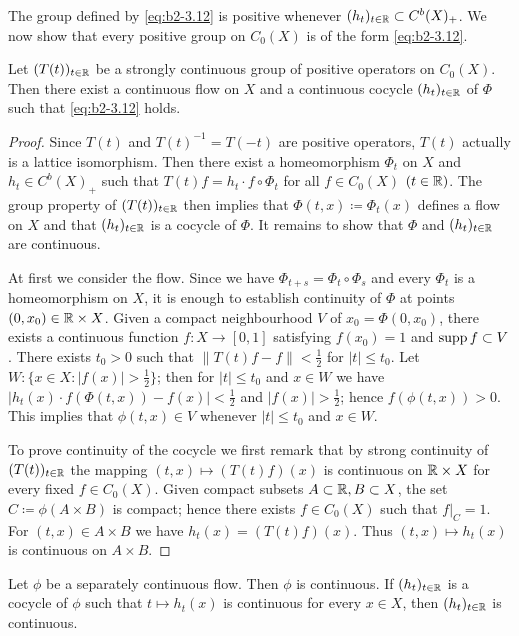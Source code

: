 The group defined by \eqref{eq:b2-3.12} is positive whenever $(h_t)_{t \in \mathbb{R}} \subset C^{b} (X)_+$.
We now show that every positive group on $C_0(X)$ is of the form \eqref{eq:b2-3.12}.
\begin{proposition}\label{prop:b2-3.9}
Let $(T(t))_{t \in \mathbb{R}}$ be a strongly continuous group of positive operators on $C_0(X)$.
Then there exist a continuous flow on $X$ and a continuous cocycle $(h_t)_{t \in \mathbb{R}}$ of $\Phi$ such that \eqref{eq:b2-3.12} holds.
\end{proposition}
\begin{proof}
Since $T(t)$ and $T(t)^{-1} = T(-t)$ are positive operators, $T(t)$ actually is a lattice isomorphism.
Then there exist a homeomorphism $\Phi_t$ on $X$ and $h_t \in C^{b}(X)_+$ such that $T(t)f = h_t \cdot f \circ \Phi_t$ for all $f \in C_0(X)$ $(t \in \mathbb{R})$.
The group property of $(T(t))_{t \in \mathbb{R}}$ then implies that $\Phi(t,x) \coloneqq \Phi_t(x)$ defines a flow on $X$ and that $(h_t)_{t \in \mathbb{R}}$ is a cocycle of $\Phi$.
It remains to show that $\Phi$ and $(h_t)_{t \in \mathbb{R}}$ are continuous.

At first we consider the flow.
Since we have $\Phi_{t+s} = \Phi_t \circ \Phi_s$ and every $\Phi_t$ is a homeomorphism on $X$, it is enough to establish continuity of $\Phi$ at points $(0,x_0) \in \mathbb{R} \times X$.
Given a compact neighbourhood $V$ of $x_0 = \Phi (0,x_0)$, there exists a continuous function $f \colon X \to [0,1]$ satisfying $f(x_0) = 1$ and $\mathop{}\!\mathrm{supp}\, f \subset V$.
There exists $t_0 > 0$ such that $\|T(t)f - f\| < \frac{1}{2}$ for $|t| \leq t_0$.
Let $W \colon \{x \in X \colon |f(x)| > \frac{1}{2}\}$; then for $|t| \leq t_0$ and $x \in W$ we have $|h_t(x) \cdot f(\Phi(t,x)) - f(x)| < \frac{1}{2}$ and $|f(x)| > \frac{1}{2}$; hence $f(\phi (t,x)) > 0$.
This implies that $\phi (t,x) \in V$ whenever $|t| \leq t_0$ and $x \in W$.

To prove continuity of the cocycle we first remark that by strong continuity of $(T(t))_{t \in \mathbb{R}}$ the mapping $(t,x) \mapsto (T(t)f) (x)$ is continuous on $\mathbb{R} \times X$ for every fixed $f \in C_0(X)$.
Given compact subsets $A \subset \mathbb{R} , B \subset X$, the set $C \coloneqq \phi(A\times B)$ is compact; hence there exists $f \in C_0(X)$ such that $f|_{C} = 1$.
For $(t,x) \in A \times B$ we have $h_t(x) = (T(t)f) (x)$.
Thus $(t,x) \mapsto h_t(x)$ is continuous on $A \times B$.
\end{proof}

\begin{corollary}\label{cor:b2-3.10}
Let $\phi$ be a separately continuous flow.
Then $\phi$ is continuous.
If $(h_t)_{t \in \mathbb{R}}$ is a cocycle of $\phi$ such that $t \mapsto h_t (x)$ is continuous for every $x \in X$, then $(h_t)_{t \in \mathbb{R}}$ is continuous.
\end{corollary}

